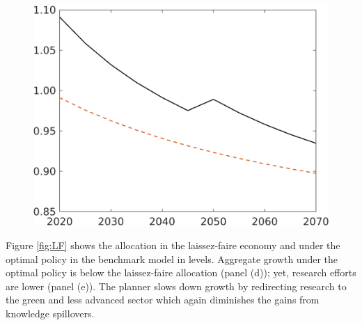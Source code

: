 \begin{figure}[h!!]
\begin{minipage}[]{0.32\textwidth}
\end{minipage}
\begin{minipage}[]{0.32\textwidth}
\includegraphics[width=1\textwidth]{../../codding_model/own_basedOnFried/optimalPol_190722_tidiedUp/figures/all_10Aout22/S_LFCompOPT_T_NoTaus_regime3_spillover0_noskill0_sep1_xgrowth0_etaa0.79_lgd0.png}
\end{minipage}

\end{figure}

Figure \ref{fig:LF} shows the allocation in the laissez-faire economy and under the optimal policy in the benchmark model in levels. 
Aggregate growth under the optimal policy is below the laissez-faire allocation (panel (d)); yet, research efforts are lower (panel (e)). The planner slows down growth by redirecting research to the green and less advanced sector which again diminishes the gains from knowledge spillovers. 

